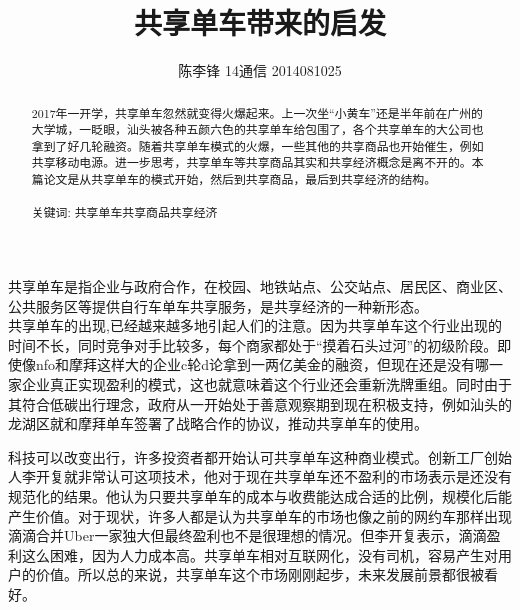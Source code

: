 \documentclass[11pt]{ctexart} %
\title{\centering \LARGE{共享单车带来的启发}\\%
} %
\author{\textsc {陈李锋 14通信 2014081025 } %
} %
\begin{document}
\maketitle %

\begin{abstract} %
2017年一开学，共享单车忽然就变得火爆起来。上一次坐“小黄车”还是半年前在广州的大学城，一眨眼，汕头被各种五颜六色的共享单车给包围了，各个共享单车的大公司也拿到了好几轮融资。随着共享单车模式的火爆，一些其他的共享商品也开始催生，例如共享移动电源。进一步思考，共享单车等共享商品其实和共享经济概念是离不开的。本篇论文是从共享单车的模式开始，然后到共享商品，最后到共享经济的结构。
\\ \\关键词: 共享单车\quad  共享商品\quad 共享经济 
\\
 

\end{abstract}

\subsubsection*{}
\paragraph{}

共享单车是指企业与政府合作，在校园、地铁站点、公交站点、居民区、商业区、公共服务区等提供自行车单车共享服务，是共享经济的一种新形态。\\

共享单车的出现,已经越来越多地引起人们的注意。因为共享单车这个行业出现的时间不长，同时竞争对手比较多，每个商家都处于“摸着石头过河”的初级阶段。即使像nfo和摩拜这样大的企业c轮d论拿到一两亿美金的融资，但现在还是没有哪一家企业真正实现盈利的模式，这也就意味着这个行业还会重新洗牌重组。同时由于其符合低碳出行理念，政府从一开始处于善意观察期到现在积极支持，例如汕头的龙湖区就和摩拜单车签署了战略合作的协议，推动共享单车的使用。

科技可以改变出行，许多投资者都开始认可共享单车这种商业模式。创新工厂创始人李开复就非常认可这项技术，他对于现在共享单车还不盈利的市场表示是还没有规范化的结果。他认为只要共享单车的成本与收费能达成合适的比例，规模化后能产生价值。对于现状，许多人都是认为共享单车的市场也像之前的网约车那样出现滴滴合并Uber一家独大但最终盈利也不是很理想的情况。但李开复表示，滴滴盈利这么困难，因为人力成本高。共享单车相对互联网化，没有司机，容易产生对用户的价值。所以总的来说，共享单车这个市场刚刚起步，未来发展前景都很被看好。
\end{document}

